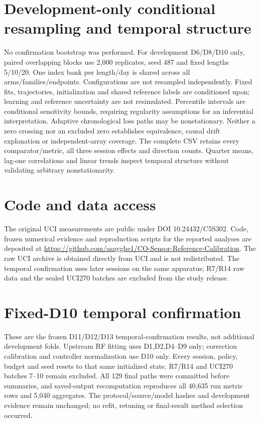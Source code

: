 \documentclass[11pt,a4paper]{article}
\newcommand{\FloatBarrier}{\par}
\begin{document}
\section{Development-only conditional resampling and temporal structure}
No confirmation bootstrap was performed. For development D6/D8/D10 only, paired overlapping blocks use 2,000 replicates, seed 487 and fixed lengths 5/10/20. One index bank per length/day is shared across all arms/families/endpoints. Configurations are not resampled independently. Fixed fits, trajectories, initialization and shared reference labels are conditioned upon; learning and reference uncertainty are not resimulated. Percentile intervals are conditional sensitivity bounds, requiring regularity assumptions for an inferential interpretation. Adaptive chronological loss paths may be nonstationary. Neither a zero crossing nor an excluded zero establishes equivalence, causal drift explanation or independent-array coverage. The complete CSV retains every comparator/metric, all three session effects and direction counts. Quarter means, lag-one correlations and linear trends inspect temporal structure without validating arbitrary nonstationarity.
\FloatBarrier
\section{Code and data access}
The original UCI measurements are public under DOI 10.24432/C5S302. Code, frozen numerical evidence and reproduction scripts for the reported analyses are deposited at \url{https://github.com/asayghe1/CO-Sensor-Reference-Calibration}. The raw UCI archive is obtained directly from UCI and is not redistributed. The temporal confirmation uses later sessions on the same apparatus; R7/R14 raw data and the sealed UCI270 batches are excluded from the study release.
\section{Fixed-D10 temporal confirmation}\label{sec:sc5}
These are the frozen D11/D12/D13 temporal-confirmation results, not additional development folds. Upstream RF fitting uses D1,D2,D4--D9 only; correction calibration and controller normalization use D10 only. Every session, policy, budget and seed resets to that same initialized state. R7/R14 and UCI270 batches 7--10 remain excluded. All 129 final paths were committed before summaries, and saved-output recomputation reproduces all 40,635 run metric rows and 5,040 aggregates. The protocol/source/model hashes and development evidence remain unchanged; no refit, retuning or final-result method selection occurred.
\end{document}

